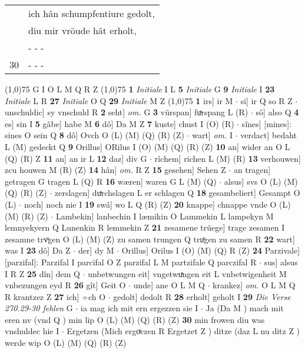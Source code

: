 \documentclass[8pt,a4paper,notitlepage]{article}
\begin{document}
\begin{table}[ht]
\begin{minipage}[t]{0.5\linewidth}
\begin{tabular}{rl}
 & ich hân schumpfentiure gedolt,\\ 
 & diu mir vröude hât erholt,\\ 
 & \multicolumn{1}{l}{ - - - }\\ 
30 & \multicolumn{1}{l}{ - - - }\\ 
\end{tabular}
\scriptsize
\line(1,0){75} \newline
G I O L M Q R Z \newline
\line(1,0){75} \newline
\textbf{1} \textit{Initiale} I L  \textbf{5} \textit{Initiale} G  \textbf{9} \textit{Initiale} I  \textbf{23} \textit{Initiale} L R  \textbf{27} \textit{Initiale} O Q  \textbf{29} \textit{Initiale} M Z  \newline
\line(1,0){75} \newline
\textbf{1} irs] ir M  $\cdot$ si] ir Q so R Z  $\cdot$ unschuldic] sy vnschuld R \textbf{2} seht] \textit{om.} G \textbf{3} vürspan] fuͯrspang L (R)  $\cdot$ sô] also Q \textbf{4} es] sin I \textbf{5} gâbe] habe M \textbf{6} dô] Da M Z \textbf{7} kuste] chust I (O) (R)  $\cdot$ sînes] [mines]: sines O sein Q \textbf{8} dô] Ovch O (L) (M) (Q) (R) (Z)  $\cdot$ wart] \textit{om.} I  $\cdot$ verdact] bedaht L (M) gedeckt Q \textbf{9} Orillus] ORilus I (O) (M) (Q) (R) (Z) \textbf{10} an] wider an O L (Q) (R) Z \textbf{11} an] an ir L \textbf{12} daz] div G  $\cdot$ rîchem] richen L (M) (R) \textbf{13} verhouwen] zcu houwen M (R) (Z) \textbf{14} hân] \textit{om.} R Z \textbf{15} gesehen] Sehen Z  $\cdot$ an tragen] getragen G tragen L (Q) R \textbf{16} wæren] waren G L (M) (Q)  $\cdot$ alsus] svs O (L) (M) (Q) (R) (Z)  $\cdot$ zerslagen] duͯrchslagen L er schlagen Q \textbf{18} gesambeliert] Gesampt O (L)  $\cdot$ noch] noch nie I \textbf{19} swâ] wo L Q (R) (Z) \textbf{20} knappe] chnappe vnde O (L) (M) (R) (Z)  $\cdot$ Lambekin] lanbechin I læmikin O Lammekin L lampekyn M lemnyekyern Q Lunenkin R lemmekin Z \textbf{21} zesamene trüege] trage zesamen I zesamne trvͦgen O (L) (M) (Z) zu samen trungen Q truͦgen zu samen R \textbf{22} wart] was I \textbf{23} dô] Da Z  $\cdot$ der] dy M  $\cdot$ Orillus] Orilus I (O) (M) (Q) R (Z) \textbf{24} Parzivale] [parzifal]: Parzifal I parcifal O Z parzifal L M partzifale Q parczifal R  $\cdot$ sus] alsus I R Z \textbf{25} dîn] dem Q  $\cdot$ unbetwungen eit] vngetwuͯngen eit L vnbetwigenheit M vnbezungen eyd R \textbf{26} gît] Geit O  $\cdot$ unde] ane O L M Q  $\cdot$ krankez] \textit{om.} O L M Q R krantzez Z \textbf{27} ich] ÷ch O  $\cdot$ gedolt] dedolt R \textbf{28} erholt] geholt I \textbf{29} \textit{Die Verse 270.29-30 fehlen} G   $\cdot$ ia mag ich mit ern ergezzen sie I  $\cdot$ Ja (Da M ) mach mit eren nv (vnd Q ) min lip O (L) (M) (Q) (R) (Z) \textbf{30} min frowen diu was vnshuldec hie I  $\cdot$ Ergetzen (Mich ergoͯczen R Ergetzet Z ) ditze (daz L nu ditz Z ) werde wip O (L) (M) (Q) (R) (Z) \newline

\end{minipage}
\end{table}
\end{document}
